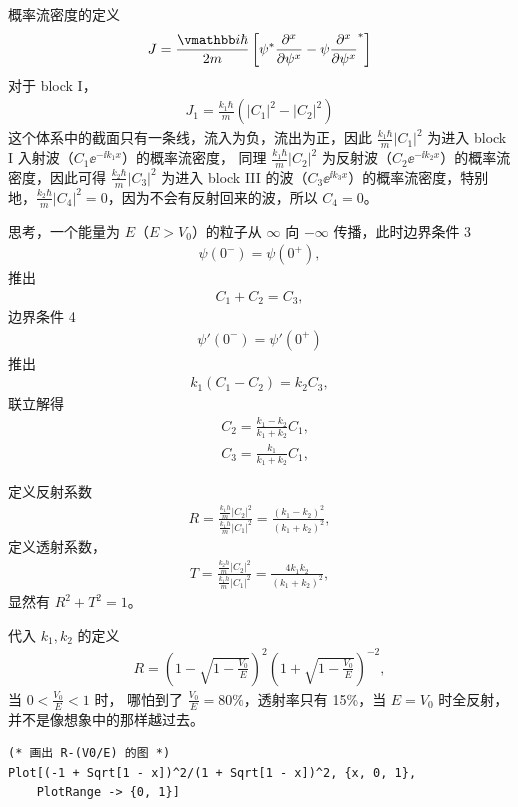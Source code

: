 概率流密度的定义
\begin{eqnarray}
    J = \frac{\ii\hbar}{2m} \left[
        \psi^* \pdv[x] \psi - \psi \pdv[x] \psi^*
    \right]
\end{eqnarray}
对于 block I，
\begin{eqnarray}
    J_1 = \frac{k_1 \hbar}{m} \left(
        |C_1|^2 - |C_2|^2
    \right)
\end{eqnarray}
这个体系中的截面只有一条线，流入为负，流出为正，因此
$\frac{k_1 \hbar}{m} |C_1|^2$ 为进入 block I 入射波（$C_1 \ee^{-\ii k_1 x}$）的概率流密度，
同理 $\frac{k_1 \hbar}{m} |C_2|^2$ 为反射波（$C_2 \ee^{-\ii k_2 x}$）的概率流密度，因此可得 $\frac{k_2 \hbar}{m} |C_3|^2$ 为进入 block III 的波（$C_3 \ee^{\ii k_3 x}$）的概率流密度，特别地，$\frac{k_2 \hbar}{m} |C_4|^2 = 0$，因为不会有反射回来的波，所以 $C_4 = 0$。

思考，一个能量为 $E$（$E>V_0$）的粒子从 $\infty$ 向 $-\infty$ 传播，此时边界条件 3
\begin{eqnarray}
    \psi(0^-) = \psi(0^+),
\end{eqnarray}
推出
\begin{eqnarray}
    C_1 + C_2 = C_3,
\end{eqnarray}
边界条件 4
\begin{eqnarray}
    \psi'(0^-) = \psi'(0^+)
\end{eqnarray}
推出
\begin{eqnarray}
    k_1 (C_1 - C_2) = k_2 C_3,
\end{eqnarray}
联立解得
\begin{align}
    & C_2 = \frac{k_1 - k_2} {k_1 + k_2} C_1, \\
    & C_3 = \frac{k_1}{k_1 + k_2} C_1,
\end{align}

定义反射系数
\begin{eqnarray}
    R = \frac{ \displaystyle \frac{k_1 h}m |C_2|^2 } { \displaystyle \frac{k_1 h}m |C_1|^2 } = \frac{(k_1 - k_2)^2} {(k_1 + k_2)^2}, 
\end{eqnarray}
定义透射系数，
\begin{eqnarray}
    T = \frac{ \displaystyle \frac{k_2 h}m |C_2|^2 } { \displaystyle \frac{k_1 h}m |C_1|^2 } = \frac{4k_1k_2} {(k_1 + k_2)^2}, 
\end{eqnarray}
显然有 $R^2 + T^2 = 1$。

代入 $k_1, k_2$ 的定义
\begin{eqnarray}
    R = \left( 1 - \sqrt{1 - \frac{V_0}E}\right)^2 
    \left( 1 + \sqrt{1 - \frac{V_0}E}\right)^{-2},
\end{eqnarray}
当 $0 < \frac{V_0}{E} < 1$ 时，
哪怕到了 $\frac{V_0}E = 80\%$，透射率只有 15\%，当 $E = V_0$ 时全反射，并不是像想象中的那样越过去。
\begin{lstlisting}
(* 画出 R-(V0/E) 的图 *)
Plot[(-1 + Sqrt[1 - x])^2/(1 + Sqrt[1 - x])^2, {x, 0, 1}, 
    PlotRange -> {0, 1}]
\end{lstlisting}

